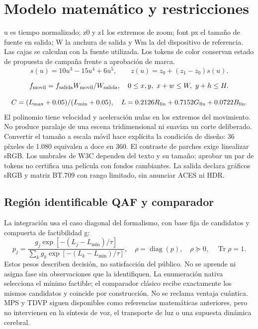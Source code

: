 \documentclass[10pt,a4paper]{article}
\begin{document}
\section{Modelo matemático y restricciones}
u es tiempo normalizado; z0 y z1 los extremos de zoom; font px el tamaño de fuente en salida; W la anchura de salida y Wm la del dispositivo de referencia. Las cajas se calculan con la fuente utilizada. Los tokens de color conservan estado de propuesta de campaña frente a aprobación de marca.
\begin{equation}s(u)=10u^3-15u^4+6u^5,\qquad z(u)=z_0+(z_1-z_0)s(u).\end{equation}

\begin{equation}f_{\rm movil}=f_{\rm salida}W_{\rm movil}/W_{\rm salida},\quad 0\leq x,y,\ x+w\leq W,\ y+h\leq H.\end{equation}

\begin{equation}C=(L_{\max}+0.05)/(L_{\min}+0.05),\quad L=0.2126R_{\rm lin}+0.7152G_{\rm lin}+0.0722B_{\rm lin}.\end{equation}
El polinomio tiene velocidad y aceleración nulas en los extremos del movimiento. No produce paralaje de una escena tridimensional ni suaviza un corte deliberado. Convertir el tamaño a escala móvil hace explícita la condición de diseño: 36 píxeles de 1.080 equivalen a doce en 360. El contraste de parches exige linealizar sRGB. Los umbrales de W3C dependen del texto y su tamaño; aprobar un par de tokens no certifica una película con fondos cambiantes. La salida declara gráficos sRGB y matriz BT.709 con rango limitado, sin anunciar ACES ni HDR.
\subsection{Región identificable QAF y comparador}
La integración usa el caso diagonal del formalismo, con base fija de candidatos y compuerta de factibilidad g:
\begin{equation}
p_j=\frac{g_j\exp[-(L_j-L_{\min})/\tau]}{\sum_k g_k\exp[-(L_k-L_{\min})/\tau]},\quad\rho=\operatorname{diag}(p),\quad\rho\succeq0,\quad\operatorname{Tr}\rho=1.
\end{equation}
Estos pesos describen decisión, no satisfacción del público. No se aprende ni asigna fase sin observaciones que la identifiquen. La enumeración nativa selecciona el mínimo factible; el comparador clásico recibe exactamente los mismos candidatos y coincide por construcción. No se reclama ventaja cuántica. MPS y TDVP siguen disponibles como referencias matemáticas anteriores, pero no intervienen en la síntesis de voz, el transporte de luz o una supuesta dinámica cerebral.
\end{document}
